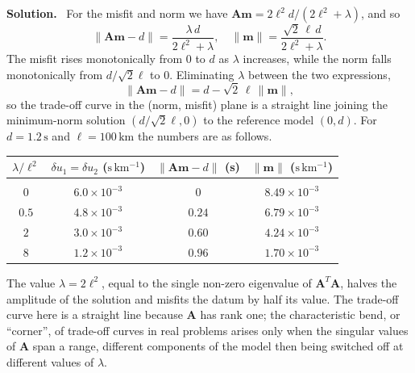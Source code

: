 \documentclass[a4paper,12pt]{paper}
\newenvironment{solution}{\par\noindent\textbf{Solution.}\ }{\par\medskip}
\begin{document}
\begin{solution}
For the misfit and norm we have $\mathbf{A}\mathbf{m} = 2\ell^{2}d/(2\ell^{2}+\lambda)$, and so
\begin{equation}
    \|\mathbf{A}\mathbf{m}-d\| = \frac{\lambda\,d}{2\ell^{2}+\lambda},\quad
    \|\mathbf{m}\| = \frac{\sqrt{2}\,\ell\,d}{2\ell^{2}+\lambda}.
    \label{eq:15}
\end{equation}
The misfit rises monotonically from $0$ to $d$ as $\lambda$ increases, while the norm falls
monotonically from $d/\sqrt{2}\ell$ to $0$. Eliminating $\lambda$ between the two expressions,
\begin{equation}
    \|\mathbf{A}\mathbf{m}-d\| = d - \sqrt{2}\,\ell\,\|\mathbf{m}\|,
    \label{eq:16}
\end{equation}
so the trade-off curve in the (norm, misfit) plane is a straight line joining the minimum-norm
solution $(d/\sqrt{2}\ell,0)$ to the reference model $(0,d)$. For $d=1.2\,\mathrm{s}$ and
$\ell=100\,\mathrm{km}$ the numbers are as follows.
\begin{center}
\begin{tabular}{cccc}
    $\lambda/\ell^{2}$ & $\delta u_{1}=\delta u_{2}$ ($\mathrm{s\,km^{-1}}$) &
    $\|\mathbf{A}\mathbf{m}-d\|$ (s) & $\|\mathbf{m}\|$ ($\mathrm{s\,km^{-1}}$) \\[2pt]
    \hline\\[-8pt]
    $0$   & $6.0\times10^{-3}$ & $0$    & $8.49\times10^{-3}$ \\
    $0.5$ & $4.8\times10^{-3}$ & $0.24$ & $6.79\times10^{-3}$ \\
    $2$   & $3.0\times10^{-3}$ & $0.60$ & $4.24\times10^{-3}$ \\
    $8$   & $1.2\times10^{-3}$ & $0.96$ & $1.70\times10^{-3}$ \\
\end{tabular}
\end{center}
The value $\lambda=2\ell^{2}$, equal to the single non-zero eigenvalue of $\mathbf{A}^{T}\mathbf{A}$,
halves the amplitude of the solution and misfits the datum by half its value. The trade-off curve
here is a straight line because $\mathbf{A}$ has rank one; the characteristic bend, or ``corner'', of
trade-off curves in real problems arises only when the singular values of $\mathbf{A}$ span a range,
different components of the model then being switched off at different values of $\lambda$.
\end{solution}
\end{document}
